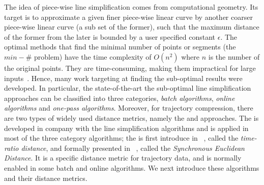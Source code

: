 The idea of piece-wise line simplification comes from computational geometry.
Its target is to approximate a given finer piece-wise linear curve by another coarser piece-wise linear curve (a sub set of the former), such that the maximum distance of the former from the later is bounded by a user specified constant $\epsilon$.
The optimal methods that find the minimal number of points or segments (\ie the $min-\#$ problem) have the time complexity of $O(n^2)$ where $n$ is the number of the original points\cite{Chan:Optimal}.
They are time-consuming, making them impractical for large inputs~\cite{Heckbert:Survey}. Hence, many work targeting at finding the sub-optimal results were developed.
In particular, the state-of-the-art the sub-optimal line simplification approaches can be classified into three categories, \ie \emph{batch algorithms}, \emph{online algorithms} and \emph{one-pass algorithms}.
%
Moreover, for trajectory compression, there are two types of widely used distance metrics, namely the \ped and \sed approaches.
The \ped is developed in company with the line simplification algorithms and is applied in most of the three category algorithms;
the \sed is first introduce in ~\cite{Meratnia:Spatiotemporal}, called the \emph{time-ratio distance}, and formally presented in ~\cite{Potamias:Sampling}, called the \emph{Synchronous Euclidean Distance}. It is a specific distance metric for trajectory data, and is normally enabled in some batch and online algorithms.
%
We next introduce these algorithms and their distance metrics.

